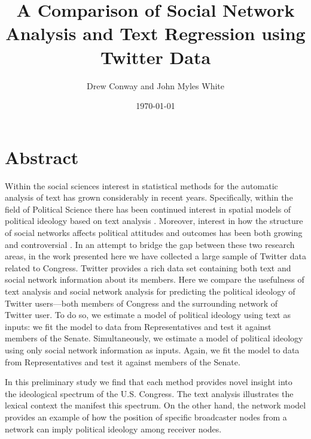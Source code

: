 \documentclass[10pt]{article}
\title{A Comparison of Social Network Analysis and Text Regression using Twitter Data}
\author{Drew Conway and John Myles White}
\date{\today}
\begin{document}
\maketitle

\section{Abstract}
Within the social sciences interest in statistical methods for the automatic analysis of text has grown considerably in recent years.  Specifically, within the field of Political Science there has been continued interest in spatial models of political ideology based on text analysis \citep{Grimmer_2011, Monroe_2008, Laver_2003}.  Moreover, interest in how the structure of social networks affects political attitudes and outcomes has been both growing \citep{Siegel_2009, Burton_2009} and controversial \citep{Fowler_2010, Lyons_2010}.  In an attempt to bridge the gap between these two research areas, in the work presented here we have collected a large sample of Twitter data related to Congress. Twitter provides a rich data set containing both text and social network information about its members. Here we compare the usefulness of text analysis and social network analysis for predicting the political ideology of Twitter users---both members of Congress and the surrounding network of Twitter user. To do so, we estimate a model of political ideology using text as inputs: we fit the model to data from Representatives and test it against members of the Senate. Simultaneously, we estimate a model of political ideology using only social network information as inputs.  Again, we fit the model to data from Representatives and test it against members of the Senate. 

In this preliminary study we find that each method provides novel insight into the ideological spectrum of the U.S. Congress.  The text analysis illustrates the lexical context the manifest this spectrum.  On the other hand, the network model provides an example of how the position of specific broadcaster nodes from a network can imply political ideology among receiver nodes.
\end{document}
